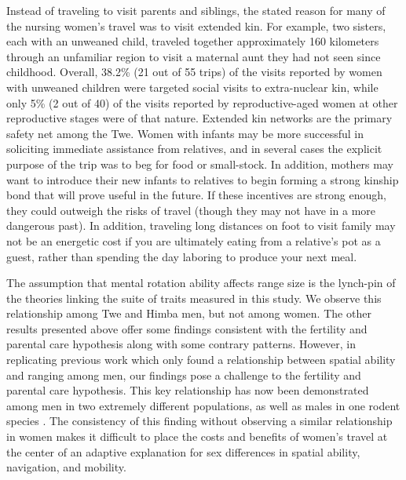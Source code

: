 Instead of traveling to visit parents and siblings, the stated reason for many of the nursing women's travel was to visit extended kin.  For example, two sisters, each with an unweaned child, traveled together approximately 160 kilometers through an unfamiliar region to visit a maternal aunt they had not seen since childhood.  Overall, 38.2\% (21 out of 55 trips) of the visits reported by women with unweaned children were targeted social visits to extra-nuclear kin, while only 5\% (2 out of 40) of the visits reported by reproductive-aged women at other reproductive stages were of that nature.  Extended kin networks are the primary safety net among the Twe.  Women with infants may be more successful in soliciting immediate assistance from relatives, and in several cases the explicit purpose of the trip was to beg for food or small-stock.  In addition, mothers may want to introduce their new infants to relatives to begin forming a strong kinship bond that will prove useful in the future.  If these incentives are strong enough, they could outweigh the risks of travel (though they may not have in a more dangerous past).  In addition, traveling long distances on foot to visit family may not be an energetic cost if you are ultimately eating from a relative's pot as a guest, rather than spending the day laboring to produce your next meal.

The assumption that mental rotation ability affects range size is the lynch-pin of the theories linking the suite of traits measured in this study.  We observe this relationship among Twe and Himba men, but not among women.  The other results presented above offer some findings consistent with the fertility and parental care hypothesis along with some contrary patterns.  However, in replicating previous work which only found a relationship between spatial ability and ranging among men, our findings pose a challenge to the fertility and parental care hypothesis.  This key relationship has now been demonstrated among men in two extremely different populations, as well as males in one rodent species \citep{spritzer2005influence}.  The consistency of this finding without observing a similar relationship in women makes it difficult to place the costs and benefits of women's travel at the center of an adaptive explanation for sex differences in spatial ability, navigation, and mobility. 






